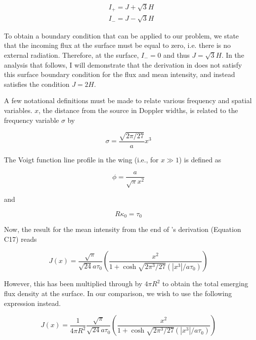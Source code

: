 \documentclass[onecolumn]{aastex63}
\begin{document}
\begin{equation}
    \begin{split}
        &I_+ = J + \sqrt{3}H \\
        &I_- = J - \sqrt{3}H
    \end{split}
\end{equation}

To obtain a boundary condition that can be applied to our problem, we state that the incoming flux at the surface must be equal to zero, i.e. there is no external radiation. Therefore, at the surface, $I_- = 0$ and thus $J=\sqrt{3}H$. In the analysis that follows, I will demonstrate that the derivation in \cite{2006ApJ...649...14D} does not satisfy this surface boundary condition for the flux and mean intensity, and instead satisfies the condition $J = 2H$.

A few notational definitions must be made to relate various frequency and spatial variables. $x$, the distance from the source in Doppler widths, is related to the frequency variable $\sigma$ by 

\begin{equation} \label{sigma}
    \sigma = \frac{\sqrt{2\pi/27}}{a} x^3
\end{equation}

\noindent The Voigt function line profile in the wing (i.e., for $x\gg1$) is defined as 

\begin{equation} \label{lineprofile}
    \phi = \frac{a}{\sqrt{\pi} x^2}
\end{equation}

\noindent and

\begin{equation} \label{tau}
    R\kappa_0 = \tau_0
\end{equation}

\noindent Now, the result for the mean intensity from the end of \cite{2006ApJ...649...14D}'s derivation (Equation C17) reads

\begin{equation} \label{dijkstra}
    J(x) = \frac{\sqrt{\pi}}{\sqrt{24}a\tau_0}\left(\frac{x^2}{1 + \cosh{\sqrt{2\pi^3/27}(|x^3|/a\tau_0)}}\right)
\end{equation}

\noindent However, this has been multiplied through by $4\pi R^2$ to obtain the total emerging flux density at the surface. In our comparison, we wish to use the following expression instead.

\begin{equation} \label{c17/4piR^2}
    J(x) = \frac{1}{4\pi R^2}\frac{\sqrt{\pi}}{\sqrt{24}a\tau_0}\left(\frac{x^2}{1 + \cosh{\sqrt{2\pi^3/27}(|x^3|/a\tau_0)}}\right)
\end{equation}
\end{document}
